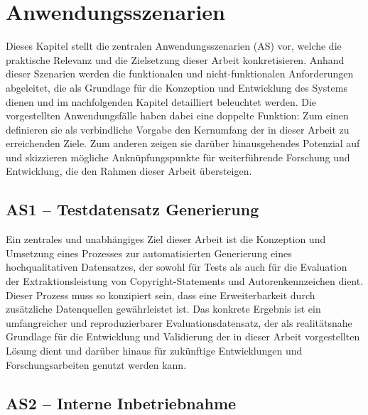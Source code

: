 \chapter{Anwendungsszenarien}\label{ch:anwendungsszenarien}

Dieses Kapitel stellt die zentralen Anwendungsszenarien (AS) vor, welche die praktische Relevanz und die Zielsetzung dieser Arbeit konkretisieren.
Anhand dieser Szenarien werden die funktionalen und nicht-funktionalen Anforderungen abgeleitet, die als Grundlage für die Konzeption und Entwicklung des Systems dienen und im nachfolgenden Kapitel  detailliert beleuchtet werden.
Die vorgestellten Anwendungsfälle haben dabei eine doppelte Funktion: Zum einen definieren sie als verbindliche Vorgabe den Kernumfang der in dieser Arbeit zu erreichenden Ziele.
Zum anderen zeigen sie darüber hinausgehendes Potenzial auf und skizzieren mögliche Anknüpfungspunkte für weiterführende Forschung und Entwicklung, die den Rahmen dieser Arbeit übersteigen.


\section{AS1 -- Testdatensatz Generierung}\label{sec:anwendungsszenario-1}

Ein zentrales und unabhängiges Ziel dieser Arbeit ist die Konzeption und Umsetzung eines Prozesses zur automatisierten Generierung eines hochqualitativen Datensatzes, der sowohl für Tests als auch für die Evaluation der Extraktionsleistung von Copyright-Statements und Autorenkennzeichen dient.
Dieser Prozess muss so konzipiert sein, dass eine Erweiterbarkeit durch zusätzliche Datenquellen gewährleistet ist.
Das konkrete Ergebnis ist ein umfangreicher und reproduzierbarer Evaluationsdatensatz, der als realitätsnahe Grundlage für die Entwicklung und Validierung der in dieser Arbeit vorgestellten Lösung dient und darüber hinaus für zukünftige Entwicklungen und Forschungsarbeiten genutzt werden kann.


\section{AS2 -- Interne Inbetriebnahme}\label{sec:anwendungsszenario-2}

